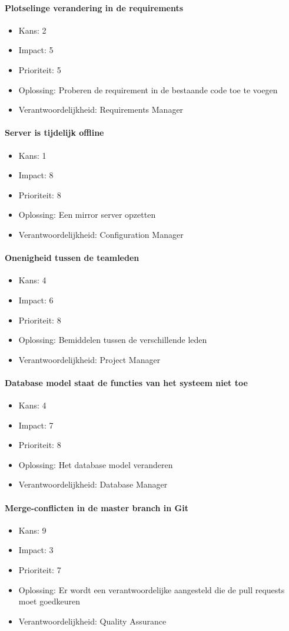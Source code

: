 \paragraph{Plotselinge verandering in de requirements}
\begin{itemize}
\item Kans: 2
\item Impact: 5
\item Prioriteit: 5
\item Oplossing: Proberen de requirement in de bestaande code toe te voegen
\item Verantwoordelijkheid: Requirements Manager
\end{itemize}

\paragraph{Server is tijdelijk offline}
\begin{itemize}
\item Kans: 1
\item Impact: 8
\item Prioriteit: 8
\item Oplossing: Een mirror server opzetten
\item Verantwoordelijkheid: Configuration Manager
\end{itemize}

\paragraph{Onenigheid tussen de teamleden}
\begin{itemize}
\item Kans: 4
\item Impact: 6
\item Prioriteit: 8
\item Oplossing: Bemiddelen tussen de verschillende leden 
\item Verantwoordelijkheid: Project Manager
\end{itemize}

\paragraph{Database model staat de functies van het systeem niet toe}
\begin{itemize}
\item Kans: 4
\item Impact: 7
\item Prioriteit: 8
\item Oplossing: Het database model veranderen
\item Verantwoordelijkheid: Database Manager
\end{itemize}

\paragraph{Merge-conflicten in de master branch in Git}
\begin{itemize}
\item Kans: 9
\item Impact: 3
\item Prioriteit: 7
\item Oplossing: Er wordt een verantwoordelijke aangesteld die de pull requests moet goedkeuren
\item Verantwoordelijkheid: Quality Assurance
\end{itemize}
